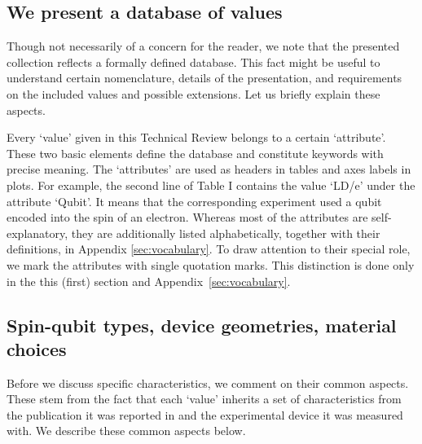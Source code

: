 \documentclass[aps, prx, showpacs, twocolumn, superscriptaddress, notitlepage, longbibliography, floatfix, nofootinbib]{revtex4-2}
\newcommand{\myKey}[1]{$\whitearrowupfrombar$\textit{#1}}
\renewcommand{\myKey}[1]{\textit{#1}}
\renewcommand{\myKey}[1]{`{#1}'}
\newcommand{\recheck}[1]{{#1}}
\begin{document}
\subsection{We present a database of values}

Though not necessarily of a concern for the reader, we note that the presented collection reflects a formally defined database. This fact might be useful to understand certain nomenclature, details of the presentation, and requirements on the included values and possible extensions. Let us briefly explain these aspects.

Every \myKey{value} given in this Technical Review belongs to a certain \myKey{attribute}. These two basic elements define the database and constitute keywords with precise meaning. The \myKey{attributes} are used as headers in tables and axes labels in plots. \recheck{For example, the second line of Table I contains the value \myKey{LD/e} under the attribute \myKey{Qubit}.} It means that the corresponding experiment used a qubit encoded into the spin of an electron. Whereas most of the attributes are self-explanatory, they are additionally listed alphabetically, together with their definitions, in Appendix \ref{sec:vocabulary}. To draw attention to their special role, we mark the attributes with single quotation marks.
This distinction is done only in the this (first) section and Appendix~\ref{sec:vocabulary}.

\subsection{Spin-qubit types, device geometries, material choices}

Before we discuss specific characteristics, we comment on their common aspects. These stem from the fact that each \myKey{value} inherits a set of characteristics from the publication it was reported in and the experimental device it was measured with. We describe these common aspects below.
\end{document}
